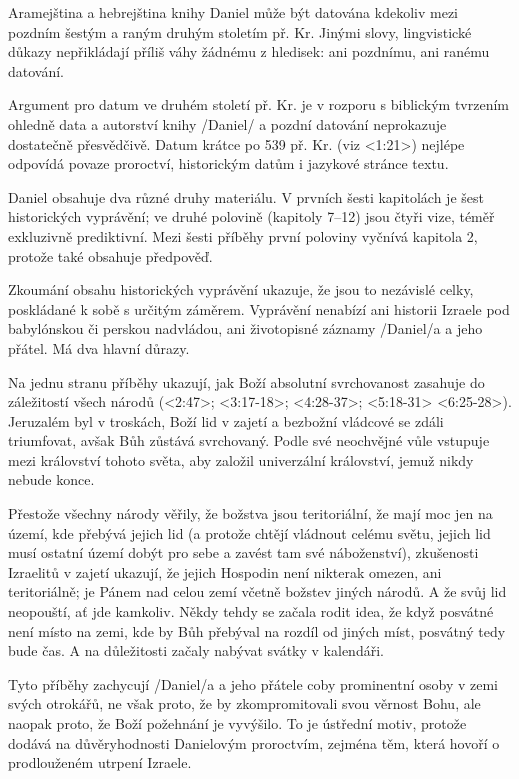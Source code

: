 Aramejština a hebrejština knihy Daniel může být datována kdekoliv mezi pozdním šestým a raným druhým stoletím př. Kr. Jinými slovy, lingvistické důkazy nepřikládají příliš váhy žádnému z hledisek: ani pozdnímu, ani ranému datování.

Argument pro datum ve druhém století př. Kr. je v rozporu s biblickým tvrzením ohledně data a autorství knihy \x/Daniel/ a pozdní datování neprokazuje dostatečně přesvědčivě.   Datum krátce po 539 př. Kr. (viz <1:21>) nejlépe odpovídá povaze proroctví, historickým datům i jazykové stránce textu.


 
 Daniel obsahuje dva různé druhy materiálu.
 V prvních šesti kapitolách je šest historických vyprávění; ve druhé polovině (kapitoly 7--12) jsou čtyři vize, téměř exkluzivně prediktivní. Mezi šesti příběhy první poloviny vyčnívá kapitola 2, protože také obsahuje předpověď. 

Zkoumání obsahu historických vyprávění ukazuje, že jsou to nezávislé celky, poskládané k sobě s určitým záměrem.
Vyprávění nenabízí ani historii Izraele pod babylónskou či perskou nadvládou, ani životopisné záznamy \x/Daniel/a a jeho přátel. Má dva hlavní důrazy.

Na jednu stranu příběhy ukazují, jak Boží absolutní svrchovanost zasahuje do záležitostí všech národů 
(<2:47>; <3:17-18>; <4:28-37>; <5:18-31> <6:25-28>).
Jeruzalém byl v troskách, Boží lid v zajetí a bezbožní vládcové se zdáli triumfovat, avšak Bůh zůstává svrchovaný.
Podle své neochvějné vůle vstupuje mezi království tohoto světa, aby založil univerzální království, jemuž nikdy nebude konce.

Přestože všechny  národy věřily, že božstva jsou teritoriální, že mají moc jen na území, kde přebývá jejich lid (a protože chtějí vládnout celému světu, jejich lid musí ostatní území dobýt pro sebe a zavést tam své náboženství), zkušenosti Izraelitů v zajetí ukazují, že jejich Hospodin není nikterak omezen, ani teritoriálně; je Pánem nad celou zemí včetně božstev jiných národů. A že svůj lid neopouští, ať jde kamkoliv. Někdy tehdy se začala rodit idea, že  když posvátné není místo na zemi, kde by Bůh přebýval na rozdíl od jiných míst, posvátný tedy bude čas. A na důležitosti začaly nabývat svátky v kalendáři. %

Tyto příběhy zachycují \x/Daniel/a a jeho přátele coby prominentní osoby v zemi svých otrokářů, ne však proto, že by zkompromitovali svou věrnost Bohu, ale naopak proto, že Boží požehnání je vyvýšilo.
To je ústřední motiv, protože dodává na důvěryhodnosti Danielovým proroctvím, zejména těm, která hovoří o prodlouženém utrpení Izraele. 


